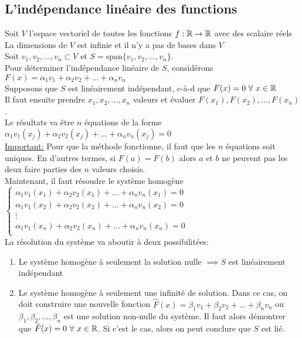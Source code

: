 \subsection{L'indépendance linéaire des functions}
Soit $V$ l'espace vectoriel de toutes les fonctions $f: \mathbb{R} \to \mathbb{R}$ avec des scalaire réels \\
La dimensions de $V$ est infinie et il n'y a pas de bases dans $V$ \\
Soit ${v_1, v_2, \dots, v_n} \subset V$ et $S = \text{span}\{v_1, v_2, \dots, v_n\}$. \\
Pour déterminer l'indépendance linéaire de $S$, considérons $F(x) = \alpha_1 v_1 + \alpha_2 v_2 + \dots + \alpha_n v_n$ \\
Supposons que $S$ est linéairement indépendant, c-à-d que $F(x) = 0 \ \forall \ x \in \mathbb{R}$ \\
Il faut ensuite prendre $x_1, x_2, \dots, x_n$ valeurs et évaluer $F(x_1), F(x_2), \dots, F(x_n)$. \\
Le résultats va être $n$ équations de la forme $\alpha_1 v_1(x_j)+ \alpha_2 v_2(x_j)+ \dots + \alpha_n v_n(x_j) = 0$ \\
\underline{Important:} Pour que la méthode fonctionne, il faut que les $n$ équations soit uniques. 
En d'autres termes, si $F(a) = F(b)$ alors $a$ et $b$ ne peuvent pas les deux faire parties des $n$ valeurs choisis. \\
Maintenant, il faut résoudre le système homogène $\begin{cases}
      \alpha_1 v_1(x_1)+ \alpha_2 v_2(x_1)+ \dots + \alpha_n v_n(x_1) = 0 \\
      \alpha_1 v_1(x_2)+ \alpha_2 v_2(x_2)+ \dots + \alpha_n v_n(x_2) = 0 \\
      \vdots \\
      \alpha_1 v_1(x_n)+ \alpha_2 v_2(x_n)+ \dots + \alpha_n v_n(x_n) = 0 \\
\end{cases}$ \\
La résolution du système va aboutir à deux possibilitées: \begin{enumerate}
      \item Le système homogène à seulement la solution nulle $\implies S$ est linéairement indépendant
      \item Le système homogène à seulement une infinité de solution. Dans ce cas, on doit construire
      une nouvelle fonction $\hat{F}(x) = \beta_1 v_1 + \beta_2 v_2 + \dots + \beta_n v_n$ ou $\beta_1, \beta_2, \dots, \beta_n$
      est une solution non-nulle du système. Il faut alors démontrer que $\hat{F}(x) = 0 \ \forall \ x \in \mathbb{R}$. 
      Si c'est le cas, alors on peut conclure que $S$ est lié.
\end{enumerate}


